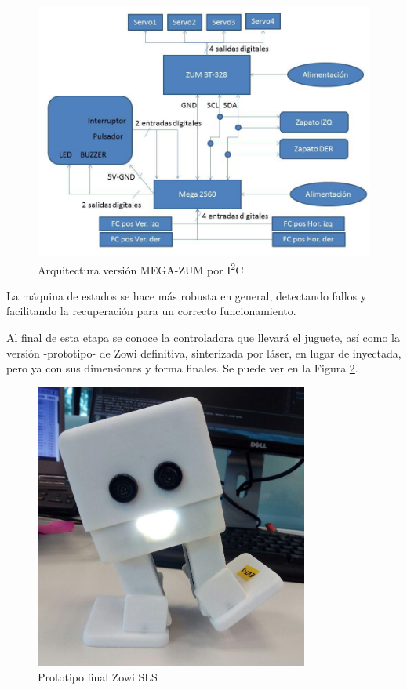 \begin{figure}
\centering
\includegraphics[width=130mm]{Figures/v3-diag}
\caption[Arquitectura versión MEGA-ZUM por I\textsuperscript{2}C]{Arquitectura versión MEGA-ZUM por I\textsuperscript{2}C}
\label{fig:v3-diag}
\end{figure}

La máquina de estados se hace más robusta en general, detectando fallos y facilitando la recuperación para un correcto funcionamiento.

Al final de esta etapa se conoce la controladora que llevará el juguete, así como la versión -prototipo- de Zowi definitiva, sinterizada por láser, en lugar de inyectada, pero ya con sus dimensiones y forma finales. Se puede ver en la Figura \ref{fig:zowi-sls}.

\begin{figure}
\centering
\includegraphics[width=90mm]{Figures/zowi-sls}
\caption[Prototipo final Zowi SLS]{Prototipo final Zowi SLS}
\label{fig:zowi-sls}
\end{figure}

